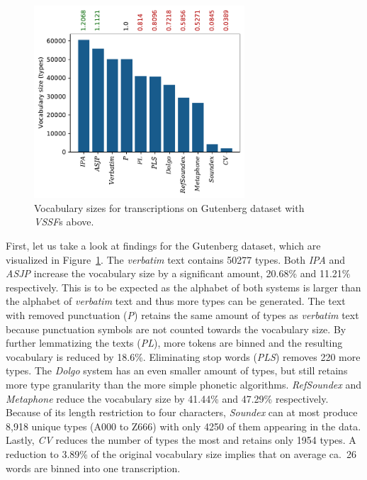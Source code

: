 \begin{figure}
  \centering
  \includegraphics[width=0.7\textwidth]{figures/vocab_sizes_2021-07-28_14-42-08_gb_pt}
  \caption{Vocabulary sizes for transcriptions on Gutenberg dataset with \textit{VSSF}s above.}
  \label{fig:vssf_transcriptions_gb}
\end{figure}
First, let us take a look at findings for the Gutenberg dataset, which are visualized in Figure~\ref{fig:vssf_transcriptions_gb}.
The \textit{verbatim} text contains 50277 types.
Both \textit{IPA} and \textit{ASJP} increase the vocabulary size by a significant amount, 20.68\% and 11.21\% respectively.
This is to be expected as the alphabet of both systems is larger than the alphabet of \textit{verbatim} text and thus more types can be generated.
The text with removed punctuation (\textit{P}) retains the same amount of types as \textit{verbatim} text because punctuation symbols are not counted towards the vocabulary size.
By further lemmatizing the texts (\textit{PL}), more tokens are binned and the resulting vocabulary is reduced by 18.6\%.
Eliminating stop words (\textit{PLS}) removes 220 more types.
The \textit{Dolgo} system has an even smaller amount of types, but still retains more type granularity than the more simple phonetic algorithms.
\textit{RefSoundex} and \textit{Metaphone} reduce the vocabulary size by 41.44\% and 47.29\% respectively.
Because of its length restriction to four characters, \textit{Soundex} can at most produce 8,918 unique types (A000 to Z666) with only 4250 of them appearing in the data.
Lastly, \textit{CV} reduces the number of types the most and retains only 1954 types.
A reduction to 3.89\% of the original vocabulary size implies that on average ca.\ 26 words are binned into one transcription.\newline
